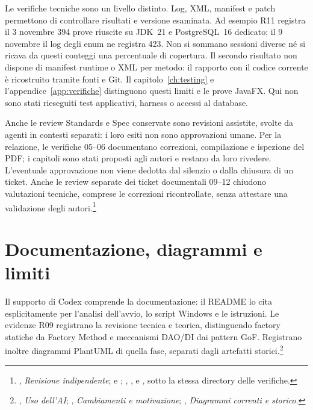 Le verifiche tecniche sono un livello distinto. Log, XML, manifest e patch
permettono di controllare risultati e versione esaminata. Ad esempio R11
registra il 3 novembre 394 prove riuscite su JDK~21 e PostgreSQL~16 dedicato;
il 9 novembre il log degli enum ne registra 423. Non si sommano sessioni
diverse né si ricava da questi conteggi una percentuale di copertura.
Il secondo risultato non dispone di manifest runtime o XML per metodo:
il rapporto con il codice corrente è ricostruito tramite fonti e Git.
Il capitolo~\ref{ch:testing} e l'appendice~\ref{app:verifiche} distinguono
questi limiti e le prove JavaFX. Qui non sono stati rieseguiti test
applicativi, harness o accessi al database.

Anche le review Standards e Spec conservate sono revisioni assistite,
svolte da agenti in contesti separati: i loro esiti non sono approvazioni
umane. Per la relazione, le verifiche 05--06 documentano correzioni,
compilazione e ispezione del PDF; i capitoli sono stati proposti agli
autori e restano da loro rivedere. L'eventuale approvazione non viene
dedotta dal silenzio o dalla chiusura di un ticket. Anche le review separate
dei ticket documentali 09--12 chiudono valutazioni tecniche, comprese le
correzioni ricontrollate, senza attestare una validazione degli autori.\footnote{\raggedright 
{}, \emph{Revisione indipendente};
 e
;
,
,  e
, sotto la stessa directory delle verifiche.}

\section{Documentazione, diagrammi e limiti}
Il supporto di Codex comprende la documentazione: il README lo cita
esplicitamente per l'analisi dell'avvio, lo script Windows e le istruzioni.
Le evidenze R09 registrano la revisione tecnica e teorica, distinguendo
factory statiche da Factory Method e meccanismi DAO/DI dai pattern GoF.
Registrano inoltre diagrammi PlantUML di quella fase, separati dagli
artefatti storici.\footnote{\raggedright {}, \emph{Uso dell'AI};
,
\emph{Cambiamenti e motivazione};
,
\emph{Diagrammi correnti e storico}.}


